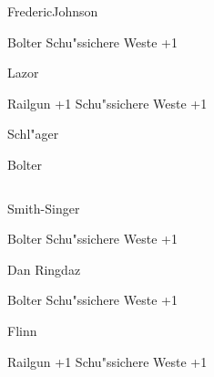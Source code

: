 \begin{column}[l]{0.45}
    \begin{nscsheet}[h]{Frederic\newline{}Johnson}
        \nscstats[ATT=2,COM=3]
        \nscruler
        \begin{nscinventory}
            \nscitem[Waffen] Bolter
            \nscitem[R"ustung] Schu"ssichere Weste +1
        \end{nscinventory}
    \end{nscsheet}

    \begin{nscsheet}[h]{Lazor}
        \nscstats[ATT=3,AGG=2]
        \nscruler
        \begin{nscinventory}
            \nscitem[Waffen] Railgun +1
            \nscitem[R"ustung] Schu"ssichere Weste +1
        \end{nscinventory}
    \end{nscsheet}


    \begin{nscsheet}[h]{Schl"ager}
        \nscstats[]
        \nscruler
        \begin{nscinventory}
            \nscitem[Waffen] Bolter
        \end{nscinventory}
    \end{nscsheet}    
\end{column}
\begin{column}[r]{0.45}
    \begin{nscsheet}[h]{Smith-Singer}
        \nscstats[ATT=2,AGG=2,DEX=2,COM=3]
        \nscruler
        \begin{nscinventory}
            \nscitem[Waffen] Bolter
            \nscitem[R"ustung] Schu"ssichere Weste +1
        \end{nscinventory}
    \end{nscsheet}

    \begin{nscsheet}[h]{Dan Ringdaz}
        \nscstats[ATT=2,AGG=2,COM=2]
        \nscruler
        \begin{nscinventory}
            \nscitem[Waffen] Bolter
            \nscitem[R"ustung] Schu"ssichere Weste +1
        \end{nscinventory}
    \end{nscsheet}

    \begin{nscsheet}[h]{Flinn}
        \nscstats[ATT=2,AGG=]
        \nscruler
        \begin{nscinventory}
            \nscitem[Waffen] Railgun +1
            \nscitem[R"ustung] Schu"ssichere Weste +1
        \end{nscinventory}
    \end{nscsheet}
\end{column}
\vfill
\pagebreak

